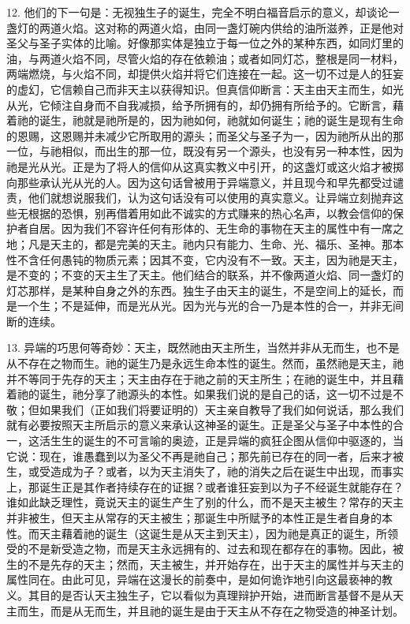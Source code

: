 12. 他们的下一句是：无视独生子的诞生，完全不明白福音启示的意义，却谈论一盏灯的两道火焰。这对称的两道火焰，由同一盏灯碗内供给的油所滋养，正是他对圣父与圣子实体的比喻。好像那实体是独立于每一位之外的某种东西，如同灯里的油，与两道火焰不同，尽管火焰的存在依赖油；或者如同灯芯，整根是同一材料，两端燃烧，与火焰不同，却提供火焰并将它们连接在一起。这一切不过是人的狂妄的虚幻，它信赖自己而非天主以获得知识。但真信仰断言：天主由天主而生，如光从光，它倾注自身而不自我减损，给予所拥有的，却仍拥有所给予的。它断言，藉着祂的诞生，祂就是祂所是的，因为祂如何，祂就如何诞生；祂的诞生是现有生命的恩赐，这恩赐并未减少它所取用的源头；而圣父与圣子为一，因为祂所从出的那一位，与祂相似，而出生的那一位，既没有另一个源头，也没有另一种本性，因为祂是光从光。正是为了将人的信仰从这真实教义中引开，的这盏灯或这火焰才被掷向那些承认光从光的人。因为这句话曾被用于异端意义，并且现今和早先都受过谴责，他们就想说服我们，认为这句话没有可以使用的真实意义。让异端立刻抛弃这些无根据的恐惧，别再借着用如此不诚实的方式赚来的热心名声，以教会信仰的保护者自居。因为我们不容许任何有形体的、无生命的事物在天主的属性中有一席之地；凡是天主的，都是完美的天主。祂内只有能力、生命、光、福乐、圣神。那本性不含任何愚钝的物质元素；因其不变，它内没有不一致。天主，因为祂是天主，是不变的；不变的天主生了天主。他们结合的联系，并不像两道火焰、同一盏灯的灯芯那样，是某种自身之外的东西。独生子由天主的诞生，不是空间上的延长，而是一个生；不是延伸，而是光从光。因为光与光的合一乃是本性的合一，并非无间断的连续。\par

13. 异端的巧思何等奇妙：天主，既然祂由天主所生，当然并非从无而生，也不是从不存在之物而生。祂的诞生乃是永远生命本性的诞生。然而，虽然祂是天主，祂并不等同于先存的天主；天主由存在于祂之前的天主所生；在祂的诞生中，并且藉着祂的诞生，祂分享了祂源头的本性。如果我们说的是自己的话，这一切不过是不敬；但如果我们（正如我们将要证明的）天主亲自教导了我们如何说话，那么我们就有必要按照天主所启示的意义来承认这神圣的诞生。正是圣父与圣子中本性的合一，这活生生的诞生的不可言喻的奥迹，正是异端的疯狂企图从信仰中驱逐的，当它说：现在，谁愚蠢到以为圣父不再是祂自己；那先前已存在的同一者，后来才被生，或受造成为子？或者，以为天主消失了，祂的消失之后在诞生中出现，而事实上，那诞生正是其作者持续存在的证据？或者谁狂妄到以为子不经诞生就能存在？谁如此缺乏理性，竟说天主的诞生产生了别的什么，而不是天主被生？常存的天主并非被生，但天主从常存的天主被生；那诞生中所赋予的本性正是生者自身的本性。而天主藉着祂的诞生（这诞生是从天主到天主），因为祂是真正的诞生，所领受的不是新受造之物，而是天主永远拥有的、过去和现在都存在的事物。因此，被生的不是先存的天主；然而，天主被生，并开始存在，出于天主的属性并与天主的属性同在。由此可见，异端在这漫长的前奏中，是如何诡诈地引向这最亵神的教义。其目的是否认天主独生子，它以看似为真理辩护开始，进而断言基督不是从天主而生，而是从无而生，并且祂的诞生是由于天主从不存在之物受造的神圣计划。\par

